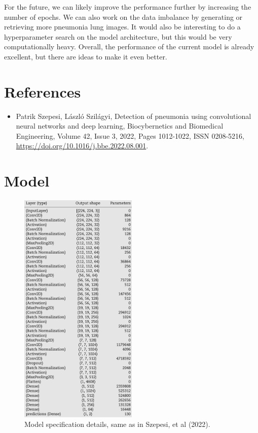 \documentclass[a4paper]{article}
\begin{document}
For the future, we can likely improve the performance further by increasing the
number of epochs. We can also work on the data imbalance by generating or
retrieving more pneumonia lung images. It would also be interesting to do a
hyperparameter search on the model architecture, but this would be very
computationally heavy. Overall, the performance of the current model is already
excellent, but there are ideas to make it even better.

\section*{References}

\begin{itemize}
	\item
		Patrik Szepesi, László Szilágyi, Detection of pneumonia using
		convolutional neural networks and deep learning, Biocybernetics and
		Biomedical Engineering, Volume 42, Issue 3, 2022, Pages 1012-1022, ISSN
		0208-5216, \url{https://doi.org/10.1016/j.bbe.2022.08.001}.
\end{itemize}

\appendix

\pagebreak
\section{Model}\label{app: model}

\begin{figure}[h]
	\centering
	\includegraphics[width = 0.5\textwidth]{imgs/specs.png}
	\caption{Model specification details, same as in Szepesi, et al (2022).}
	\label{fig: specs}
\end{figure}
\end{document}
